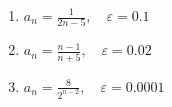 \begin{ueb}{}{}
\begin{enumerate}
		      \begin{enumerate}
			      \item $a_n = \frac{1}{2n - 5}, \quad \varepsilon = 0.1$
			      \item $a_n = \frac{n - 1}{n + 5}, \quad \varepsilon = 0.02$
			      \item $a_n = \frac{8}{2^{n-2}}, \quad \varepsilon = 0.0001$
		      \end{enumerate}
	\end{enumerate}
\end{ueb}

